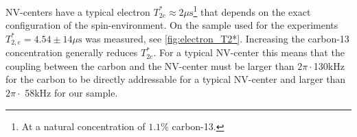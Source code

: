 NV-centers have a typical electron $T_{2e}^* \approx 2\mu \mathrm{s}$\footnote{At a natural concentration of $1.1 \%$ carbon-13.} that depends on the exact configuration of the spin-environment.
On the sample used for the experiments $T_{2,e}^* = 4.54 \pm 14 \mu\mathrm{s}$ was measured, see \cref{fig:electron_T2*}.
Increasing the carbon-13 concentration generally reduces $T_{2e}^*$.
For a typical NV-center this means that the coupling between the carbon and the NV-center must be larger than $2\pi\cdot$130kHz for the carbon to be directly addressable for a typical NV-center and larger than $2\pi\cdot$ 58kHz for our sample.










